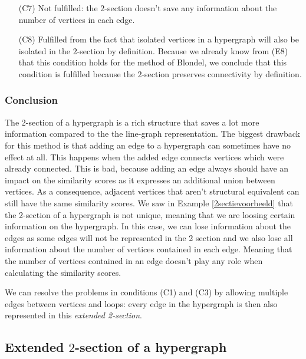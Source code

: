 \documentclass[a4paper,11pt]{report}
\begin{document}
\begin{itemize}
\begin{proof}
 \end{proof}
 Because the $2$-section preserves structural equivalent vertices and we use the method of Blondel for which we already proved
 in (E6) that this condition holds, the result follows.
   
  
     
     \item [(C7)] Not fulfilled: the $2$-section doesn't save any information 
     about the number of vertices in each edge. 
  \item[(C8)] Fulfilled from the fact that isolated vertices in a hypergraph will 
  also be isolated in the $2$-section by definition. Because we already know from (E8) that this condition
  holds for the method of Blondel, we conclude that 
  this condition is fulfilled because the $2$-section preserves connectivity by 
  definition.
  \end{itemize}  

\subsubsection{Conclusion}
The $2$-section of a hypergraph is a rich structure that 
saves a lot more information compared to the the line-graph representation. The biggest drawback for this method is that 
adding an edge to a hypergraph can sometimes have no effect at all. This happens when 
the added edge connects vertices which were already connected. This is bad, because adding an edge always should have an impact on 
  the similarity scores as it expresses an additional union between vertices. As a consequence, adjacent vertices that aren't structural equivalent
  can still have the same similarity scores. We saw in Example \ref{2sectievoorbeeld} that
  the 2-section of a hypergraph is not unique, meaning that we are loosing certain
  information on the hypergraph. In this case, we can lose information about 
  the edges as some edges will not be represented in the 2 section and we also lose 
  all information about 
  the number of vertices contained in each edge. Meaning that the number of vertices
  contained in an edge doesn't play any role when calculating the similarity scores. 
  
 We can resolve the problems in conditions (C1) and (C3) by allowing multiple edges
  between vertices and loops: every edge in the hypergraph is then also represented in this \emph{extended 2-section}.
  
  \subsection{Extended $2$-section of a hypergraph}
\end{document}
